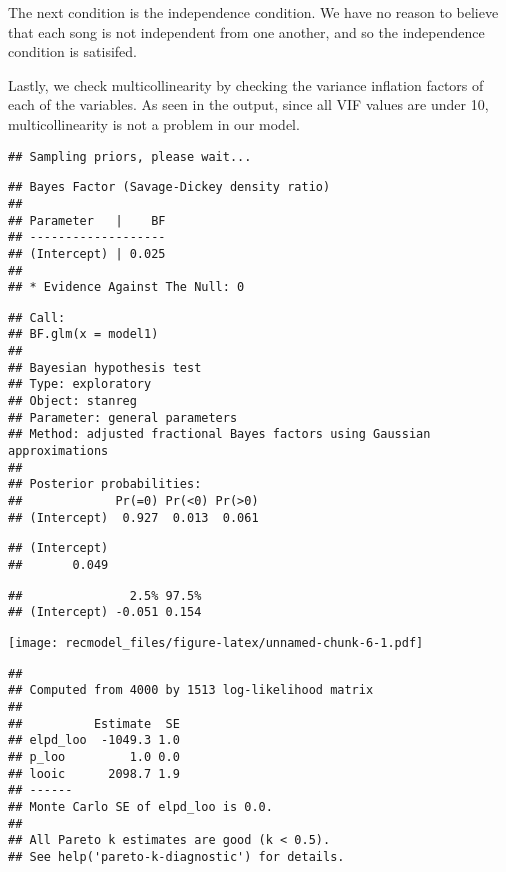 \documentclass[
]{article}
\begin{document}
The next condition is the independence condition. We have no reason to
believe that each song is not independent from one another, and so the
independence condition is satisifed.

Lastly, we check multicollinearity by checking the variance inflation
factors of each of the variables. As seen in the output, since all VIF
values are under 10, multicollinearity is not a problem in our model.

\begin{verbatim}
## Sampling priors, please wait...
\end{verbatim}

\begin{verbatim}
## Bayes Factor (Savage-Dickey density ratio)
## 
## Parameter   |    BF
## -------------------
## (Intercept) | 0.025
## 
## * Evidence Against The Null: 0
\end{verbatim}

\begin{verbatim}
## Call:
## BF.glm(x = model1)
## 
## Bayesian hypothesis test
## Type: exploratory
## Object: stanreg
## Parameter: general parameters
## Method: adjusted fractional Bayes factors using Gaussian approximations
## 
## Posterior probabilities:
##             Pr(=0) Pr(<0) Pr(>0)
## (Intercept)  0.927  0.013  0.061
\end{verbatim}

\begin{verbatim}
## (Intercept) 
##       0.049
\end{verbatim}

\begin{verbatim}
##               2.5% 97.5%
## (Intercept) -0.051 0.154
\end{verbatim}

\texttt{[image: recmodel\_files/figure-latex/unnamed-chunk-6-1.pdf]}

\begin{verbatim}
## 
## Computed from 4000 by 1513 log-likelihood matrix
## 
##          Estimate  SE
## elpd_loo  -1049.3 1.0
## p_loo         1.0 0.0
## looic      2098.7 1.9
## ------
## Monte Carlo SE of elpd_loo is 0.0.
## 
## All Pareto k estimates are good (k < 0.5).
## See help('pareto-k-diagnostic') for details.
\end{verbatim}
\end{document}
